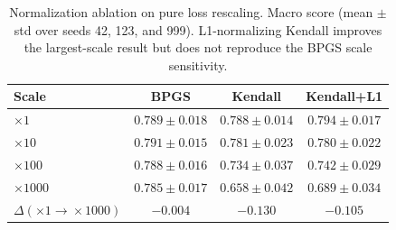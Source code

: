 \begin{table}[t]
\centering
\caption{Normalization ablation on pure loss rescaling. Macro score (mean $\pm$ std over seeds 42, 123, and 999). L1-normalizing Kendall improves the largest-scale result but does not reproduce the BPGS scale sensitivity.}
\label{tab:norm_ablation}
\small
\begin{tabular}{lccc}
\toprule
Scale & BPGS & Kendall & Kendall+L1 \\
\midrule
$\times1$    & $0.789 \pm 0.018$ & $0.788 \pm 0.014$ & $0.794 \pm 0.017$ \\
$\times10$   & $0.791 \pm 0.015$ & $0.781 \pm 0.023$ & $0.780 \pm 0.022$ \\
$\times100$  & $0.788 \pm 0.016$ & $0.734 \pm 0.037$ & $0.742 \pm 0.029$ \\
$\times1000$ & $0.785 \pm 0.017$ & $0.658 \pm 0.042$ & $0.689 \pm 0.034$ \\
\midrule
$\Delta(\times1\!\to\!\times1000)$ & $-0.004$ & $-0.130$ & $-0.105$ \\
\bottomrule
\end{tabular}
\end{table}
